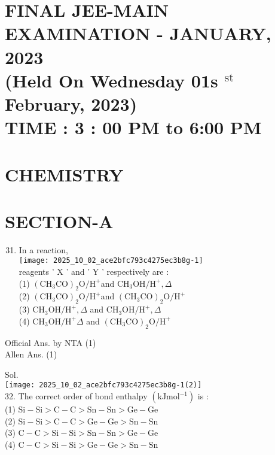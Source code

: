 \documentclass[10pt]{article}
\begin{document}
\captionsetup{singlelinecheck=false}
\section*{FINAL JEE-MAIN EXAMINATION - JANUARY, 2023 \\
 (Held On Wednesday 01s \({ }^{\text {st }}\) February, 2023) \\
 TIME : 3 : 00 PM to 6:00 PM}
\section*{CHEMISTRY}
\section*{SECTION-A}
\begin{enumerate}
  \setcounter{enumi}{30}
  \item In a reaction,\\
\texttt{[image: 2025\_10\_02\_ace2bfc793c4275ec3b8g-1]}\\
reagents ' X ' and ' Y ' respectively are :\\
(1) \(\left(\mathrm{CH}_{3} \mathrm{CO}\right)_{2} \mathrm{O} / \mathrm{H}^{+}\)and \(\mathrm{CH}_{3} \mathrm{OH} / \mathrm{H}^{+}, \Delta\)\\
(2) \(\left(\mathrm{CH}_{3} \mathrm{CO}\right)_{2} \mathrm{O} / \mathrm{H}^{+}\)and \(\left(\mathrm{CH}_{3} \mathrm{CO}\right)_{2} \mathrm{O} / \mathrm{H}^{+}\)\\
(3) \(\mathrm{CH}_{3} \mathrm{OH} / \mathrm{H}^{+}, \Delta\) and \(\mathrm{CH}_{3} \mathrm{OH} / \mathrm{H}^{+}, \Delta\)\\
(4) \(\mathrm{CH}_{3} \mathrm{OH} / \mathrm{H}^{+} \Delta\) and \(\left(\mathrm{CH}_{3} \mathrm{CO}\right)_{2} \mathrm{O} / \mathrm{H}^{+}\)
\end{enumerate}

Official Ans. by NTA (1)\\
Allen Ans. (1)

Sol.\\
\texttt{[image: 2025\_10\_02\_ace2bfc793c4275ec3b8g-1(2)]}\\
32. The correct order of bond enthalpy \(\left(\mathrm{kJ} \mathrm{mol}^{-1}\right)\) is :\\
(1) \(\mathrm{Si}-\mathrm{Si}>\mathrm{C}-\mathrm{C}>\mathrm{Sn}-\mathrm{Sn}>\mathrm{Ge}-\mathrm{Ge}\)\\
(2) \(\mathrm{Si}-\mathrm{Si}>\mathrm{C}-\mathrm{C}>\mathrm{Ge}-\mathrm{Ge}>\mathrm{Sn}-\mathrm{Sn}\)\\
(3) \(\mathrm{C}-\mathrm{C}>\mathrm{Si}-\mathrm{Si}>\mathrm{Sn}-\mathrm{Sn}>\mathrm{Ge}-\mathrm{Ge}\)\\
(4) \(\mathrm{C}-\mathrm{C}>\mathrm{Si}-\mathrm{Si}>\mathrm{Ge}-\mathrm{Ge}>\mathrm{Sn}-\mathrm{Sn}\)
\end{document}
